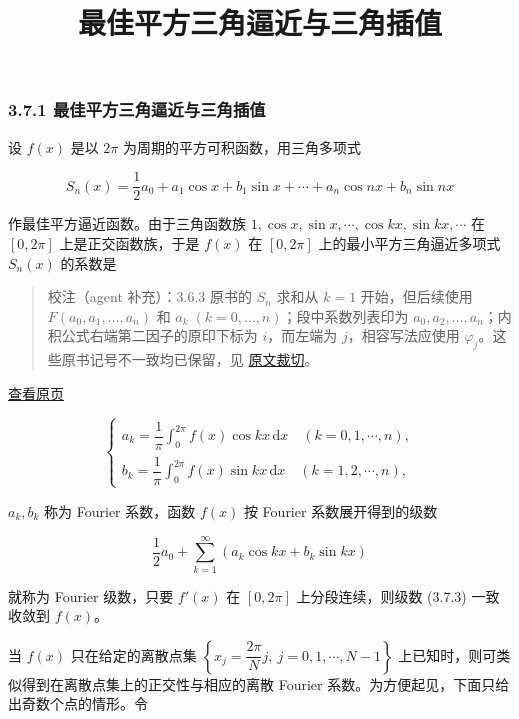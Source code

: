 \documentclass[
  10pt,
  fontset=fandol]{ctexart}
\title{最佳平方三角逼近与三角插值}
\author{}
\date{}
\begin{document}
\maketitle

\subsubsection{3.7.1 最佳平方三角逼近与三角插值}\label{ux6700ux4f73ux5e73ux65b9ux4e09ux89d2ux903cux8fd1ux4e0eux4e09ux89d2ux63d2ux503c}

设 \(f(x)\) 是以 \(2\pi\) 为周期的平方可积函数，用三角多项式

\[
S_n(x)=\frac12a_0+a_1\cos x+b_1\sin x+\cdots+a_n\cos nx+b_n\sin nx\tag{3.7.1}
\]

作最佳平方逼近函数。由于三角函数族 \(1,\allowbreak \cos x,\allowbreak \sin x,\allowbreak \cdots,\allowbreak \cos kx,\allowbreak \sin kx,\allowbreak \cdots\) 在 \([0,2\pi]\) 上是正交函数族，于是 \(f(x)\) 在 \([0,2\pi]\) 上的最小平方三角逼近多项式 \(S_n(x)\) 的系数是

\begin{quote}
校注（agent 补充）：3.6.3 原书的 \(S_n\) 求和从 \(k=1\) 开始，但后续使用 \(F(a_0,a_1,\ldots,a_n)\) 和 \(a_k\;(k=0,\ldots,n)\)；段中系数列表印为 \(a_0,a_2,\ldots,a_n\)；内积公式右端第二因子的原印下标为 \(i\)，而左端为 \(j\)，相容写法应使用 \(\varphi_j\)。这些原书记号不一致均已保留，见 \href{../assets/ch03b/p084-multivariate-formulas.png}{原文裁切}。
\end{quote}

\href{../../source-images/pdf-085.jpeg}{查看原页}

\[
\begin{cases}
a_k=\dfrac1\pi\displaystyle\int_0^{2\pi}f(x)\cos kx\,\mathrm dx\quad(k=0,1,\cdots,n),\\[4pt]
b_k=\dfrac1\pi\displaystyle\int_0^{2\pi}f(x)\sin kx\,\mathrm dx\quad(k=1,2,\cdots,n),
\end{cases}\tag{3.7.2}
\]

\(a_k,b_k\) 称为 Fourier 系数，函数 \(f(x)\) 按 Fourier 系数展开得到的级数

\[
\frac12a_0+\sum_{k=1}^{\infty}(a_k\cos kx+b_k\sin kx)\tag{3.7.3}
\]

就称为 Fourier 级数，只要 \(f'(x)\) 在 \([0,2\pi]\) 上分段连续，则级数 (3.7.3) 一致收敛到 \(f(x)\)。

当 \(f(x)\) 只在给定的离散点集 \(\left\{x_j=\dfrac{2\pi}{N}j,\ j=0,1,\cdots,N-1\right\}\) 上已知时，则可类似得到在离散点集上的正交性与相应的离散 Fourier 系数。为方便起见，下面只给出奇数个点的情形。令
\end{document}
